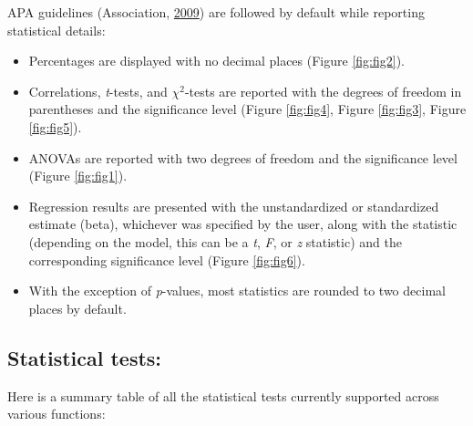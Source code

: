 \documentclass[]{article}
\providecommand{\tightlist}{%
  \setlength{\itemsep}{0pt}\setlength{\parskip}{0pt}}
\begin{document}
APA guidelines (Association, \protect\hyperlink{ref-associationPublicationManualAmerican2009}{2009}) are followed by
default while reporting statistical details:

\begin{itemize}
\tightlist
\item
  Percentages are displayed with no decimal places (Figure \ref{fig:fig2}).
\item
  Correlations, \emph{t}-tests, and \(\chi^2\)-tests are reported with the degrees
  of freedom in parentheses and the significance level (Figure \ref{fig:fig4},
  Figure \ref{fig:fig3}, Figure \ref{fig:fig5}).
\item
  ANOVAs are reported with two degrees of freedom and the significance level
  (Figure \ref{fig:fig1}).
\item
  Regression results are presented with the unstandardized or standardized
  estimate (beta), whichever was specified by the user, along with the
  statistic (depending on the model, this can be a \emph{t}, \emph{F}, or \emph{z} statistic)
  and the corresponding significance level (Figure \ref{fig:fig6}).
\item
  With the exception of \emph{p}-values, most statistics are rounded to two decimal
  places by default.
\end{itemize}

\hypertarget{statistical-tests}{%
\subsection{Statistical tests:}\label{statistical-tests}}

Here is a summary table of all the statistical tests currently supported across
various functions:
\end{document}
